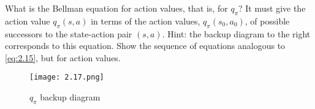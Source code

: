 
\begin{exercise}[Exercise 3.17]

What is the Bellman equation for action values, that is, for $q_\pi$?
It must give the action value $q_\pi(s, a)$ in terms of the action values, $q_\pi(s_0, a_0)$, of possible successors to the state-action pair $(s, a)$.
Hint:
the backup diagram to the right corresponds to this equation.
Show the sequence of equations analogous to \eqref{eq:2.15}, but for action values.

\begin{figure}[H]
    \centering
    \texttt{[image: 2.17.png]}
    \caption{$q_\pi$ backup diagram}
    \label{fig:2.17}
\end{figure}

\end{exercise}


